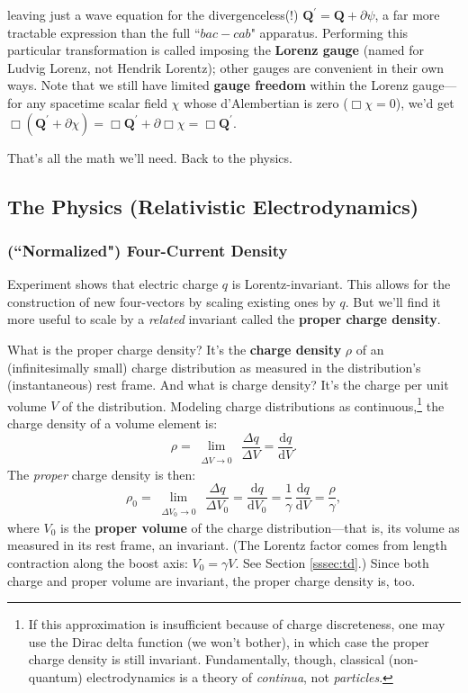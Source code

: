 \documentclass[12pt]{article}
\renewcommand{\vv}[1]{\mathbf{#1}}
\newcommand{\dd}[1]{\mathrm{d}#1}
\begin{document}
leaving just a wave equation for the divergenceless(!) $\vv Q^\prime = \vv Q + \partialup \psi$, a far more tractable expression than the full ``$bac - cab$" apparatus. Performing this particular transformation is called imposing the \textbf{Lorenz gauge} (named for Ludvig Lorenz, not Hendrik Lorentz); other gauges are convenient in their own ways. Note that we still have limited \textbf{gauge freedom} within the Lorenz gauge---for any spacetime scalar field $\chi$ whose d'Alembertian is zero (${\Box \chi = 0}$), we'd get $\Box ( \vv Q^\prime + \partialup \chi ) = \Box \vv Q^\prime + \partialup \Box \chi = \Box \vv Q^\prime$.

That's all the math we'll need. Back to the physics.



\subsection{The Physics (Relativistic Electrodynamics)}

\subsubsection[("Normalized") Four-Current Density]{(``Normalized") Four-Current Density}

Experiment shows that electric charge $q$ is Lorentz-invariant. This allows for the construction of new four-vectors by scaling existing ones by $q$. But we'll find it more useful to scale by a \emph{related} invariant called the \textbf{proper charge density}.

What is the proper charge density? It's the \textbf{charge density} $\rho$ of an (infinitesimally small) charge distribution as measured in the distribution's (instantaneous) rest frame. And what is charge density? It's the charge per unit volume $V$ of the distribution. Modeling charge distributions as continuous,\footnote{\label{fn:ddf}If this approximation is insufficient because of charge discreteness, one may use the Dirac delta function (we won't bother), in which case the proper charge density is still invariant. Fundamentally, though, classical (non-quantum) electrodynamics is a theory of \emph{continua}, not \emph{particles}.} the charge density of a volume element is:
\begin{equation*}
\rho = \lim\limits_{\substack{\\ \Delta V \to 0}} \, \dfrac{\Delta q}{\Delta V} = \dfrac{\dd q}{\dd V} .
\end{equation*}
The \emph{proper} charge density is then:
\begin{equation*}
\rho_0 = \lim\limits_{\substack{\\ \Delta V_0 \to 0}} \, \dfrac{\Delta q}{\Delta V_0} = \dfrac{\dd q}{\dd V_0} = \dfrac{1}{\gamma} \, \dfrac{\dd q}{\dd V} = \dfrac{\rho}{\gamma},
\end{equation*}
where $V_0$ is the \textbf{proper volume} of the charge distribution---that is, its volume as measured in its rest frame, an invariant. (The Lorentz factor comes from length contraction along the boost axis: $V_0 = \gamma V$. See Section \ref{sssec:td}.) Since both charge and proper volume are invariant, the proper charge density is, too.
\end{document}
